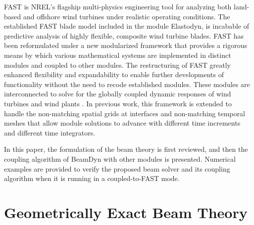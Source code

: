 \documentclass{aiaa-tc}
\begin{document}
FAST is NREL's flagship multi-physics engineering tool for analyzing both land-based and offshore wind turbines under realistic operating conditions.  
The established FAST blade model included in the module Elastodyn, is incabable 
of predictive analysis of highly flexible, composite wind turbine blades. 
FAST has been reformulated under a new modularized framework that provides a rigorous means by which various mathematical systems are implemented in distinct modules and coupled to other modules. 
The restructuring of FAST greatly enhanced flexibility and expandability to enable further developments of functionality without the need to recode established modules. 
These modules are interconnected to solve for the globally coupled dynamic responses of wind turbines and wind plants \cite{Jonkman:2013,website:FASTModularizationFramework}. In previous work, this framework is extended to handle the non-matching spatial grids at interfaces and non-matching temporal meshes that allow module solutions to advance with different time increments and different time integrators.\cite{Sprague:2014}

In this paper, the formulation of the beam theory is first reviewed, and then the coupling algorithm of BeamDyn with other modules is presented. 
Numerical examples are provided to verify the proposed beam solver and its coupling algorithm when it is running in a coupled-to-FAST mode.

\section{Geometrically Exact Beam Theory}
\end{document}
